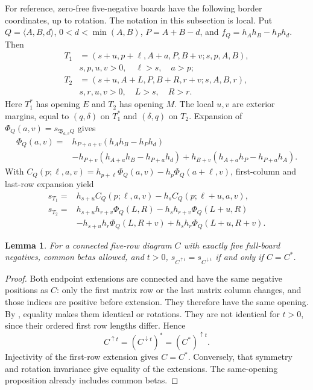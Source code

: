 \documentclass[11pt,a4paper]{amsart}
\numberwithin{equation}{section}
\theoremstyle{plain}
\newtheorem{lemma}[theorem]{Lemma}
\theoremstyle{definition}
\newcommand{\B}{\mathfrak B}
\begin{document}
For reference, zero-free five-negative boards have the following border
coordinates, up to rotation.  The notation in this subsection is local.  
Put \(Q=\langle A,B,d\rangle\), \(0<d<\min(A,B)\),
\(P=A+B-d\), and \(f_Q=h_Ah_B-h_Ph_d\).  Then
\begin{equation}\label{eq:five-profiles}
 \begin{aligned}
 T_1&=(s+u,p+\ell,A+a,P,B+v;s,p,A,B),\\
 &s,p,u,v>0,\quad \ell>s,\quad a>p;\\
 T_2&=(s+u,A+L,P,B+R,r+v;s,A,B,r),\\
 &s,r,u,v>0,\quad L>s,\quad R>r.
 \end{aligned}
\end{equation}
Here \(T_1^*\) has opening \(E\) and \(T_2\) has opening \(M\).  
The local \(u,v\) are exterior margins, equal to \((q,\delta)\)
on \(T_1^*\) and \((\delta,q)\) on \(T_2\).  Expansion of
\(\Phi_Q(a,v)=s_{\B_{a,v}Q}\) gives
\begin{equation}\label{eq:phi-five}
 \begin{split}
 \Phi_Q(a,v)={}&h_{P+a+v}(h_Ah_B-h_Ph_d)\\
 &-h_{P+v}(h_{A+a}h_B-h_{P+a}h_d)
   +h_{B+v}(h_{A+a}h_P-h_{P+a}h_A).
 \end{split}
\end{equation}
With \(C_Q(p;\ell,a,v)=h_{p+\ell}\Phi_Q(a,v)-h_p\Phi_Q(a+\ell,v)\),
first-column and last-row expansion yield
\begin{equation}\label{eq:t-polynomials}
 \begin{aligned}
 s_{T_1}={}&h_{s+u}C_Q(p;\ell,a,v)-h_sC_Q(p;\ell+u,a,v),\\
 s_{T_2}={}&h_{s+u}h_{r+v}\Phi_Q(L,R)-h_sh_{r+v}\Phi_Q(L+u,R)\\
 &-h_{s+u}h_r\Phi_Q(L,R+v)+h_sh_r\Phi_Q(L+u,R+v).
 \end{aligned}
\end{equation}

\begin{lemma}\label{lem:five-endpoint}
For a connected five-row diagram \(C\) with exactly five full-board
negatives, common betas allowed, and \(t>0\),
\(s_{C^{\uparrow t}}=s_{C^{\downarrow t}}\) if and only if \(C=C^*\).
\end{lemma}

\begin{proof}
Both endpoint extensions are connected and have the same negative
positions as \(C\): only the first matrix row or the last matrix
column changes, and those indices are positive before extension.  
They therefore have the same opening.  By
, equality makes them identical or
rotations.  They are not identical for \(t>0\), since their ordered
first row lengths differ.  Hence
\[
 C^{\uparrow t}=(C^{\downarrow t})^*=(C^*)^{\uparrow t}.
\]
Injectivity of the first-row extension gives \(C=C^*\).  Conversely,
that symmetry and rotation invariance give equality of the extensions.  
The same-opening proposition already includes common betas.  
\end{proof}
\end{document}
